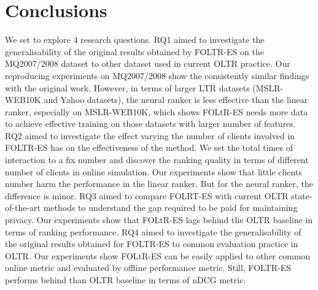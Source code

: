 \section{Conclusions}

We set to explore 4 research questions. RQ1 aimed to investigate the generalisability of the original results obtained  by FOLTR-ES on the MQ2007/2008 dataset to other dataset used in current OLTR practice. Our reproducing experiments on MQ2007/2008 show the consistently similar findings with the original work. However, in terms of larger LTR datasets (MSLR-WEB10K and Yahoo datasets), the neural ranker is less effective than the linear ranker, especially on MSLR-WEB10K, which shows FOLtR-ES needs more data to achieve effective training on those datasets with larger number of features.
RQ2 aimed to investigate the effect varying the number of clients involved in FOLTR-ES has on the effectiveness of the method. We set the total times of interaction to a fix number and discover the ranking quality in terms of different number of clients in online simulation. Our experiments show that little clients number harm the performance in the linear ranker. But for the neural ranker, the difference is minor.
RQ3 aimed to compare FOLRT-ES with current OLTR state-of-the-art methods to understand the gap required to be paid for maintaining privacy. Our experiments show that FOLtR-ES lags behind the OLTR baseline in terms of ranking performance.
RQ4 aimed to investigate the generalisability of the original results obtained for FOLTR-ES to common evaluation practice in OLTR. Our experiments show FOLtR-ES can be easily applied to other common online metric and evaluated by offline performance metric. Still, FOLTR-ES performs behind than OLTR baseline in terms of nDCG metric.